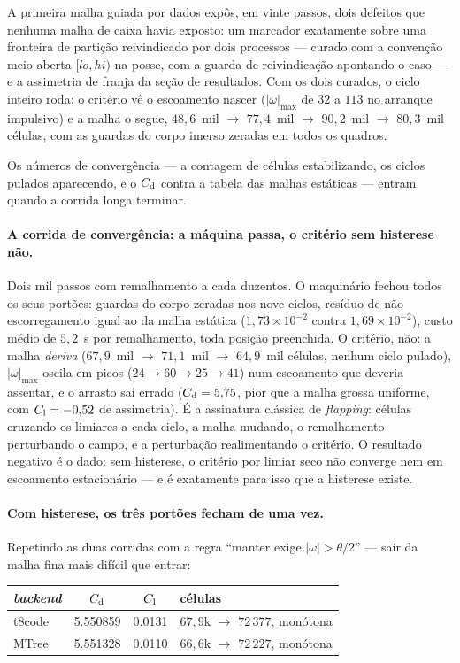 A primeira malha guiada por dados expôs, em vinte passos, dois defeitos que
nenhuma malha de caixa havia exposto: um marcador exatamente sobre uma
fronteira de partição reivindicado por dois processos --- curado com a
convenção meio-aberta $[lo, hi)$ na posse, com a guarda de reivindicação
apontando o caso --- e a assimetria de franja da seção de resultados. Com os
dois curados, o ciclo inteiro roda: o critério vê o escoamento nascer
($|\omega|_{\max}$ de $32$ a $113$ no arranque impulsivo) e a malha o segue,
$48{,}6$~mil $\to$ $77{,}4$~mil $\to$ $90{,}2$~mil $\to$ $80{,}3$~mil células,
com as guardas do corpo imerso zeradas em todos os quadros.

Os números de convergência --- a contagem de células estabilizando, os ciclos
pulados aparecendo, e o $C_{\mathrm{d}}$ contra a tabela das malhas estáticas --- entram
quando a corrida longa terminar.

\paragraph{A corrida de convergência: a máquina passa, o critério sem histerese
não.} Dois mil passos com remalhamento a cada duzentos. O maquinário fechou
todos os seus portões: guardas do corpo zeradas nos nove ciclos, resíduo de não
escorregamento igual ao da malha estática ($1{,}73\times10^{-2}$ contra
$1{,}69\times10^{-2}$), custo médio de $5{,}2$~s por remalhamento, toda posição
preenchida. O critério, não: a malha \emph{deriva} ($67{,}9$~mil $\to$
$71{,}1$~mil $\to$ $64{,}9$~mil células, nenhum ciclo pulado), $|\omega|_{\max}$
oscila em picos ($24 \to 60 \to 25 \to 41$) num escoamento que deveria assentar,
e o arrasto sai errado ($C_{\mathrm{d}} = 5{,}75$, pior que a malha grossa uniforme, com
$C_{\mathrm{l}} = -0{,}52$ de assimetria). É a assinatura clássica de \emph{flapping}:
células cruzando os limiares a cada ciclo, a malha mudando, o remalhamento
perturbando o campo, e a perturbação realimentando o critério. O resultado
negativo é o dado: sem histerese, o critério por limiar seco não converge nem
em escoamento estacionário --- e é exatamente para isso que a histerese existe.

\paragraph{Com histerese, os três portões fecham de uma vez.} Repetindo as duas
corridas com a regra ``manter exige $|\omega| > \theta/2$'' --- sair da malha
fina mais difícil que entrar:

\begin{center}
\begin{tabular}{lSSl}
  \toprule
  \emph{backend} & {$C_{\mathrm{d}}$} & {$C_{\mathrm{l}}$} & células \\
  \midrule
  t8code & 5.550859 & 0.0131 & $67{,}9$k $\to$ $72\,377$, monótona \\
  MTree  & 5.551328 & 0.0110 & $66{,}6$k $\to$ $72\,227$, monótona \\
  \bottomrule
\end{tabular}
\end{center}

